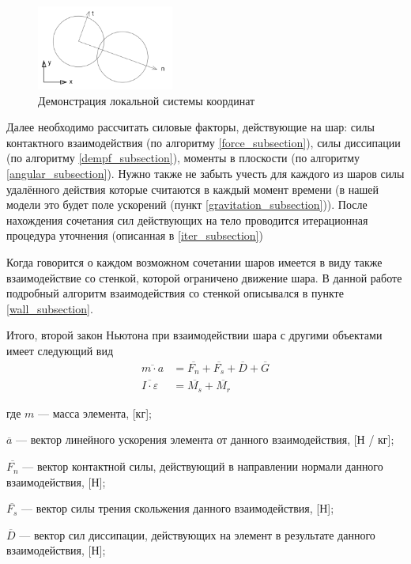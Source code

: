 \documentclass[utf8x, 14pt, oneside, a4paper]{article}
\begin{document}
\begin{figure}[h!]
	\centering
	\includegraphics[width=0.4\textwidth]{local}
	\caption{Демонстрация локальной системы координат}
	\label{pic:local}
\end{figure} 

Далее необходимо рассчитать силовые факторы, действующие на шар: силы контактного взаимодействия (по алгоритму \ref{force_subsection}), силы диссипации (по алгоритму \ref{dempf_subsection}), моменты в плоскости (по алгоритму \ref{angular_subsection}). 
Нужно также не забыть учесть для каждого из шаров силы удалённого действия которые считаются в каждый момент времени (в нашей модели это будет поле ускорений (пункт \ref{gravitation_subsection})). 
После нахождения сочетания сил действующих на тело проводится итерационная процедура уточнения (описанная в \ref{iter_subsection})

Когда говорится о каждом возможном сочетании шаров имеется в виду также взаимодействие со стенкой, которой ограничено движение шара. 
В данной работе подробный алгоритм взаимодействия со стенкой описывался в пункте \ref{wall_subsection}.

Итого, второй закон Ньютона при взаимодействии шара с другими объектами имеет следующий вид
\begin{align}
\overline{m \cdot a} &= \overline{F_n} + \overline{F_s} + \overline{D} + \overline{G}\\
\overline{I \cdot \varepsilon} &= \overline{M_s} + \overline{M_r}
\end{align}

где $m$ --- масса элемента, [кг];

$\overline{a}$ --- вектор линейного ускорения элемента от данного взаимодействия, [Н / кг];

$\overline{F_n}$ --- вектор контактной силы, действующий в направлении нормали данного взаимодействия, [Н];

$\overline{F_s}$ --- вектор силы трения скольжения данного взаимодействия, [Н];

$ \overline{D}$ --- вектор сил диссипации, действующих на элемент в результате данного взаимодействия, [Н];
\end{document}
